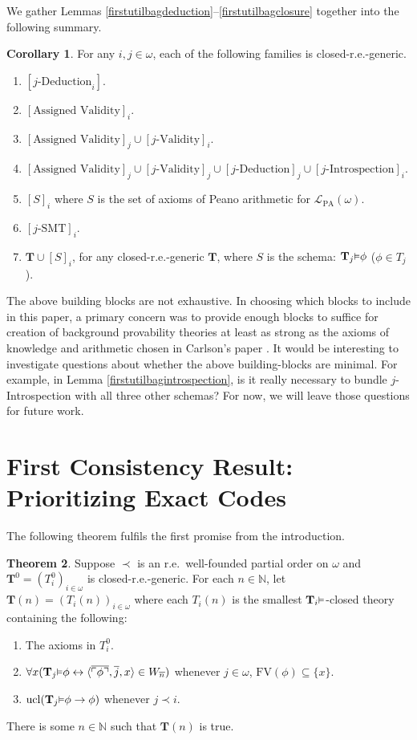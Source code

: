 \documentclass[reqno]{article}
\theoremstyle{definition}
\newtheorem{theorem}{Theorem}
\newtheorem{corollary}[theorem]{Corollary}
\def\N{\mathbb{N}}
\def\L{\mathscr{L}}
\def\T{\mathbf{T}}
\def\FV{\mathrm{FV}}
\def\LPA{\L_{\mathrm{PA}}}
\renewcommand{\Pr}[1]{\T_{#1}\mbox{\small${\vDash}$}}
\newcommand{\ucl}[1]{\mathrm{ucl}(#1)}
\begin{document}
We gather Lemmas \ref{firstutilbagdeduction}--\ref{firstutilbagclosure}
together into the following summary.

\begin{corollary}
\label{closedregenericsummary}
For any $i,j\in\omega$, each of the following families is closed-r.e.-generic.
\begin{enumerate}
    \item
    $[\mbox{$j$-Deduction}_i]$.
    \item
    $[\mbox{Assigned Validity}]_i$.
    \item
    $[\mbox{Assigned Validity}]_j \cup [\mbox{$j$-Validity}]_i$.
    \item
    $[\mbox{Assigned Validity}]_j \cup [\mbox{$j$-Validity}]_j
    \cup [\mbox{$j$-Deduction}]_j \cup [\mbox{$j$-Introspection}]_i$.
    \item
    $[S]_i$ where $S$ is the set of axioms of Peano arithmetic for $\LPA(\omega)$.
    \item
    $[\mbox{$j$-SMT}]_i$.
    \item $\T\cup [S]_i$, for any closed-r.e.-generic $\T$,
    where $S$ is the schema: $\Pr j\phi$ ($\phi\in T_j$).
\end{enumerate}
\end{corollary}

The above building blocks are not exhaustive. In choosing which blocks to include
in this paper, a primary concern was to provide enough blocks to suffice for creation
of background provability theories at least as strong as the axioms of knowledge and
arithmetic chosen in Carlson's paper \cite{carlson2000}. It would be interesting to
investigate questions about whether the above building-blocks are minimal. For example,
in Lemma \ref{firstutilbagintrospection}, is it really necessary to bundle
$j$-Introspection with all three other schemas? For now, we will leave those questions
for future work.

\section{First Consistency Result: Prioritizing Exact Codes}

The following theorem fulfils the first promise from the introduction.


\begin{theorem}
\label{onethreethree}
Suppose $\prec$ is an r.e.~well-founded
partial order on $\omega$
and $\T^0=(T^0_i)_{i\in \omega}$ is closed-r.e.-generic.
For each $n\in\N$,
let $\T(n)=(T_i(n))_{i\in \omega}$
where each $T_i(n)$ is the smallest $\Pr i$-closed theory
containing the following:
\begin{enumerate}
\item The axioms in $T^0_i$.
\item $\forall x(\Pr j\phi\leftrightarrow\langle\overline{\ulcorner\phi\urcorner},\overline j,x\rangle\in W_{\overline n})$
whenever $j\in\omega$, 
$\FV(\phi)\subseteq\{x\}$.
\item $\ucl{\Pr j\phi\rightarrow\phi}$ whenever $j\prec i$.
\end{enumerate}
There is some $n\in\N$ such that $\T(n)$ is true.
\end{theorem}
\end{document}
